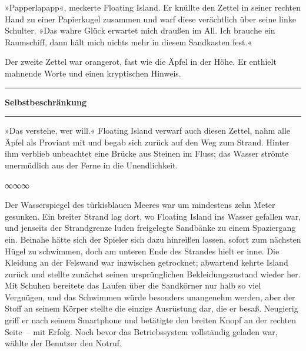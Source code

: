 »Papperlapapp«, meckerte Floating Island. Er knüllte den Zettel in seiner rechten Hand zu einer Papierkugel zusammen und warf diese verächtlich über seine linke Schulter. »Das wahre Glück erwartet mich draußen im All. Ich brauche ein Raumschiff, dann hält mich nichts mehr in diesem Sandkasten fest.«

Der zweite Zettel war orangerot, fast wie die Äpfel in der Höhe. Er enthielt mahnende Worte und einen kryptischen Hinweis.

\noindent \parbox{\textwidth}{ \vspace{3ex} \hrule \vspace{3ex}

\textbf{Selbstbeschränkung}


\vspace{3ex} \hrule \vspace{3ex} }

»Das verstehe, wer will.« Floating Island verwarf auch diesen Zettel, nahm alle Äpfel als Proviant mit und begab sich zurück auf den Weg zum Strand. Hinter ihm verblieb unbeachtet eine Brücke aus Steinen im Fluss; das Wasser strömte unermüdlich aus der Ferne in die Unendlichkeit.

\begin{center}
∞∞∞
\end{center}

Der Wasserspiegel des türkisblauen Meeres war um mindestens zehn Meter gesunken. Ein breiter Strand lag dort, wo Floating Island ins Wasser gefallen war, und jenseits der Strandgrenze luden freigelegte Sandbänke zu einem Spaziergang ein. Beinahe hätte sich der Spieler sich dazu hinreißen lassen, sofort zum nächsten Hügel zu schwimmen, doch am unteren Ende des Strandes hielt er inne. Die Kleidung an der Felswand war inzwischen getrocknet; abwartend kehrte Island zurück und stellte zunächst seinen ursprünglichen Bekleidungszustand wieder her. Mit Schuhen bereitete das Laufen über die Sandkörner nur halb so viel Vergnügen, und das Schwimmen würde besonders unangenehm werden, aber der Stoff an seinem Körper stellte die einzige Ausrüstung dar, die er besaß. Neugierig griff er nach seinem Smartphone und betätigte den breiten Knopf an der rechten Seite~– mit Erfolg. Noch bevor das Betriebssystem vollständig geladen war, wählte der Benutzer den Notruf.


